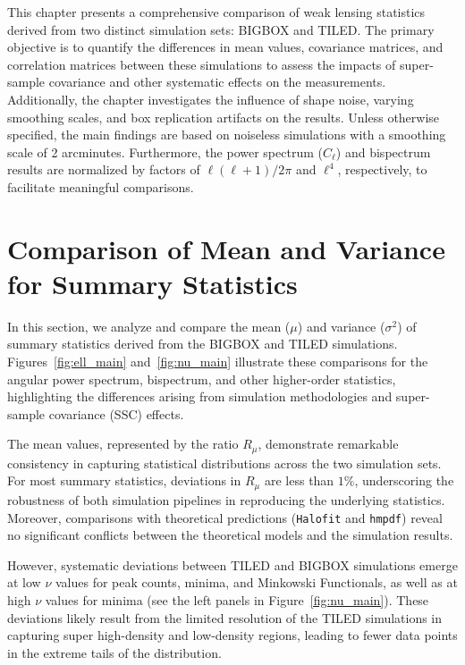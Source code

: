 This chapter presents a comprehensive comparison of weak lensing statistics derived from two distinct simulation sets: BIGBOX and TILED. The primary objective is to quantify the differences in mean values, covariance matrices, and correlation matrices between these simulations to assess the impacts of super-sample covariance and other systematic effects on the measurements. Additionally, the chapter investigates the influence of shape noise, varying smoothing scales, and box replication artifacts on the results. Unless otherwise specified, the main findings are based on noiseless simulations with a smoothing scale of 2 arcminutes. Furthermore, the power spectrum ($C_\ell$) and bispectrum results are normalized by factors of $\ell(\ell+1)/2\pi$ and $\ell^4$, respectively, to facilitate meaningful comparisons.

\section{Comparison of Mean and Variance for Summary Statistics}
In this section, we analyze and compare the mean ($\mu$) and variance ($\sigma^2$) of summary statistics derived from the BIGBOX and TILED simulations. Figures~\ref{fig:ell_main} and~\ref{fig:nu_main} illustrate these comparisons for the angular power spectrum, bispectrum, and other higher-order statistics, highlighting the differences arising from simulation methodologies and super-sample covariance (SSC) effects.

The mean values, represented by the ratio $R_{\mu}$, demonstrate remarkable consistency in capturing statistical distributions across the two simulation sets. For most summary statistics, deviations in $R_{\mu}$ are less than $1\%$, underscoring the robustness of both simulation pipelines in reproducing the underlying statistics. Moreover, comparisons with theoretical predictions (\texttt{Halofit} and \texttt{hmpdf}) reveal no significant conflicts between the theoretical models and the simulation results.

However, systematic deviations between TILED and BIGBOX simulations emerge at low $\nu$ values for peak counts, minima, and Minkowski Functionals, as well as at high $\nu$ values for minima (see the left panels in Figure~\ref{fig:nu_main}). These deviations likely result from the limited resolution of the TILED simulations in capturing super high-density and low-density regions, leading to fewer data points in the extreme tails of the distribution.

